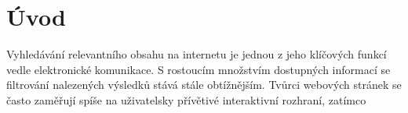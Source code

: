 \chapter*{Úvod}

Vyhledávání relevantního obsahu na internetu je jednou z jeho klíčových funkcí vedle elektronické komunikace. S rostoucím množstvím dostupných informací se filtrování nalezených výsledků stává stále obtížnějším. Tvůrci webových stránek se často zaměřují spíše na uživatelsky přívětivé interaktivní rozhraní, zatímco 
